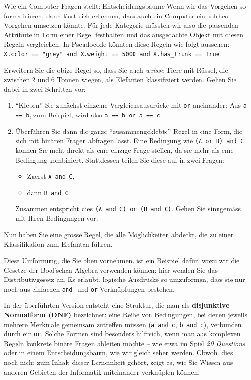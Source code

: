 \begin{lpu}{Wie ein Computer Fragen stellt: Entscheidungsbäume}
Wenn wir das Vorgehen so formalisieren, dann lässt sich erkennen, dass auch ein Computer ein solches Vorgehen umsetzen könnte. Für jede Kategorie müssten wir also die passenden Attribute in Form einer Regel festhalten und das ausgedachte Objekt mit diesen Regeln vergleichen. In Pseudocode könnten diese Regeln wie folgt aussehen: \noindent\colorbox{orange!10}{\texttt{X.color == "grey"\ and X.weight == 5000 and X.has\_trunk == True}}.

\begin{aufgabe}{2}
\label{sec:elephant}
Erweitern Sie die obige Regel so, dass Sie auch \textit{weisse} Tiere mit Rüssel, die zwischen 2 und 6 Tonnen wiegen, als Elefanten klassifiziert werden. Gehen Sie dabei in zwei Schritten vor:
\begin{enumerate}
    \item ``Kleben'' Sie zunächst einzelne Vergleichsausdrücke mit \texttt{or} aneinander: Aus \texttt{a == b}, zum Beispiel, wird also \texttt{a == b or a == c}
    \item Überführen Sie dann die ganze ``zusammengeklebte'' Regel in eine Form, die sich mit binären Fragen abfragen lässt. Eine Bedingung wie \texttt{(A or B) and C} können Sie nicht direkt als eine einzige Frage stellen, da sie mehr als eine Bedingung kombiniert. Stattdessen teilen Sie diese auf in zwei Fragen:
    \begin{itemize}
        \item Zuerst \texttt{A and C},
        \item dann \texttt{B and C}.
    \end{itemize}
    Zusammen entspricht dies \texttt{(A and C) or (B and C)}. Gehen Sie sinngemäss mit Ihren Bedingungen vor.
\end{enumerate}
\end{aufgabe}

Nun haben Sie eine grosse Regel, die alle Möglichkeiten abdeckt, die zu einer Klassifikation zum Elefanten führen.

\begin{hinweis}
Diese Umformung, die Sie oben vornehmen, ist ein Beispiel dafür, wozu wir die Gesetze der Bool'schen Algebra verwenden können: hier wenden Sie das Distributivgesetz an. Es erlaubt, logische Ausdrücke so umzuformen, dass sie nur noch aus einfachen \texttt{and}- und \texttt{or}-Verknüpfungen bestehen.

In der überführten Version entsteht eine Struktur, die man als \textbf{disjunktive Normalform (DNF)} bezeichnet: eine Reihe von Bedingungen, bei denen jeweils mehrere Merkmale gemeinsam zutreffen müssen (\texttt{a and c}, \texttt{b and c}), verbunden durch ein \texttt{or}. Solche Formen sind besonders hilfreich, wenn man aus komplexen Regeln konkrete binäre Fragen ableiten möchte – wie etwa im Spiel \emph{20 Questions} oder in einem Entscheidungsbaum, wie wir gleich sehen werden. Obwohl dies noch nicht zum Inhalt dieser Lerneinheit gehört, zeigt es, wie Sie Wissen aus anderen Gebieten der Informatik miteinander verknüpfen können.
\end{hinweis}


\end{lpu}

